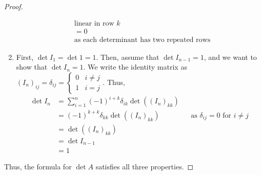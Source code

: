 \documentclass[letterpaper,12pt]{article}
\begin{document}
\begin{proof}
\begin{enumerate}
\begin{align*}
        & \text{linear in row $k$} \\
        & = 0 \\
        & \text{as each determinant has two repeated rows}
    \end{align*}
    \item First, $\det{I_1} = \det{1} = 1$. Then, assume that $\det{I_{n-1}} = 1$, and we want to show that $\det{I_n} = 1$. We write the identity matrix as $(I_n)_{ij} = \delta_{ij} = \begin{cases} 0 & i \neq j \\ 1 & i = j \end{cases}$. Thus,
    \begin{align*}
        \det{I_n} & = \sum_{i = 1}^n (-1)^{i+k} \delta_{ik} \det{((I_n)_{kk})} \\
        & = (-1)^{k + k} \delta_{kk} \det{((I_n)_{kk})} && \text{as $\delta_{ij} = 0$ for $i \neq j$} \\
        & = \det{((I_n)_{kk})} \\
        & = \det{I_{n-1}} \\
        & = 1
    \end{align*}
\end{enumerate}
Thus, the formula for $\det{A}$ satisfies all three properties.
\end{proof}
\end{document}
